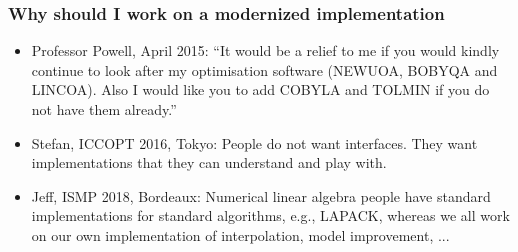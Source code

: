 \documentclass[slidestop,mathserif,xcolor=dvipsnames]{beamer}
\begin{document}
\begin{frame}
    \frametitle{Why should \textbf{\textrm{I}} work on a modernized implementation}

            \vspace{2ex}
    \begin{itemize}
        \item Professor Powell, April 2015: ``It would be a relief to me if you would kindly continue
            to look after my optimisation software (NEWUOA, BOBYQA and LINCOA). Also I would like
            you to add COBYLA and TOLMIN if you do not have them already.''
            \vspace{1ex}
        \item Stefan, ICCOPT 2016, Tokyo: People do not want interfaces. They want
            implementations that they can understand and play with.
            \vspace{1ex}
        \item Jeff, ISMP 2018, Bordeaux: Numerical linear algebra people have standard
            implementations for standard algorithms, e.g., LAPACK, whereas we all work on our own
            implementation of interpolation, model improvement, ...
    \end{itemize}
\end{frame}
\end{document}
